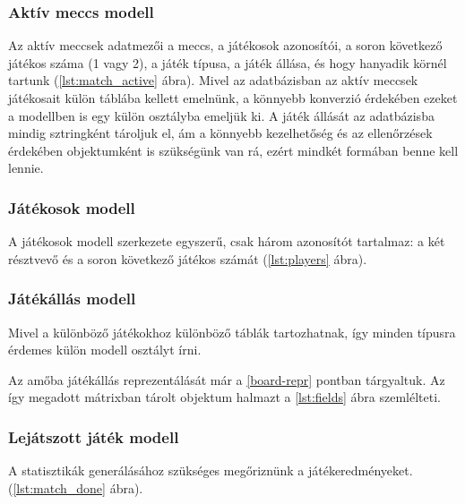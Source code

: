 

\subsubsection{Aktív meccs modell}
Az aktív meccsek adatmezői a meccs, a játékosok azonosítói, a soron következő játékos száma (1 vagy 2), a játék típusa, a játék állása, és hogy hanyadik körnél tartunk (\ref{lst:match_active} ábra). Mivel az adatbázisban az aktív meccsek játékosait külön táblába kellett emelnünk, a könnyebb konverzió érdekében ezeket a modellben is egy külön osztályba emeljük ki. A játék állását az adatbázisba mindig sztringként tároljuk el, ám a könnyebb kezelhetőség és az ellenőrzések érdekében objektumként is szükségünk van rá, ezért mindkét formában benne kell lennie.



\subsubsection{Játékosok modell}
A játékosok modell szerkezete egyszerű, csak három azonosítót tartalmaz: a két résztvevő és a soron következő játékos számát (\ref{lst:players} ábra).



\subsubsection{Játékállás modell}
Mivel a különböző játékokhoz különböző táblák tartozhatnak, így minden típusra érdemes külön modell osztályt írni.

Az amőba játékállás reprezentálását már a \ref{board-repr} pontban tárgyaltuk. Az így megadott mátrixban tárolt objektum halmazt a \ref{lst:fields} ábra szemlélteti.



\subsubsection{Lejátszott játék modell}
A statisztikák generálásához szükséges megőriznünk a játékeredményeket. (\ref{lst:match_done} ábra).

